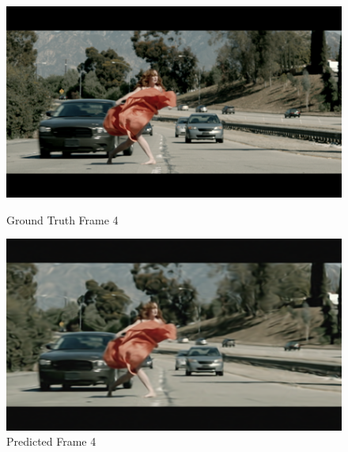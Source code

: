 \documentclass{ioereport}
\begin{document}
    \begin{figure}[H]
    \centering
    \begin{minipage}{0.45\textwidth}
        \centering
        \includegraphics[width=\linewidth]{assets/video_results/im4.png}
        \caption{Ground Truth Frame 4}
        \label{fig:gt-frame-4}
    \end{minipage}\hfill
    \begin{minipage}{0.45\textwidth}
        \centering
        \includegraphics[width=\linewidth]{assets/video_results/pred3.png}
        \caption{Predicted Frame 4}
        \label{fig:pred-frame-4}
    \end{minipage}
\end{figure}
\end{document}
